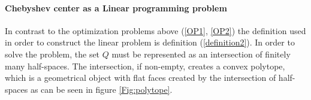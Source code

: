 \documentclass[]{article}
\newcommand{\Q}[0]{\textit{Q}}
\begin{document}
\paragraph{Chebyshev center as a Linear programming problem \\}
In contrast to the optimization problems above (\ref{OP1}, \ref{OP2}) the definition used in order to construct the linear problem is definition (\ref{definition2}). In order to solve the problem, the set $\Q$ must be represented as an intersection of finitely many half-spaces. The intersection, if non-empty, creates a convex polytope, which is a geometrical object with flat faces created by the intersection of half-spaces as can be seen in figure \ref{Fig:polytope}.

\begin{figure}[!h]
	

\end{figure}
\end{document}
